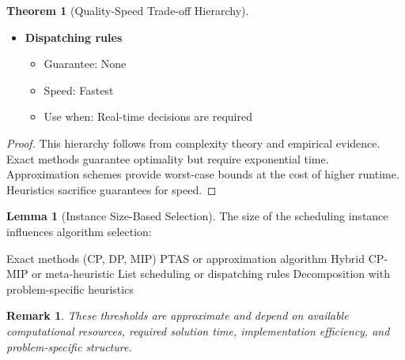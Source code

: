\documentclass{article}
\newtheorem{remark}{Remark}
\theoremstyle{definition}
\newtheorem{theorem}{Theorem}
\newtheorem{lemma}{Lemma}
\begin{document}
\begin{theorem}[Quality-Speed Trade-off Hierarchy]
\begin{itemize}
    \item \textbf{Dispatching rules}
    \begin{itemize}
        \item Guarantee: None
        \item Speed: Fastest
        \item Use when: Real-time decisions are required
    \end{itemize}
\end{itemize}

\begin{proof}
This hierarchy follows from complexity theory and empirical evidence. Exact methods guarantee optimality but require exponential time. Approximation schemes provide worst-case bounds at the cost of higher runtime. Heuristics sacrifice guarantees for speed.
\end{proof}
\end{theorem}

\begin{lemma}[Instance Size-Based Selection]
The size of the scheduling instance influences algorithm selection:

\begin{algorithm}
\caption{Algorithm Selection Based on Instance Size}
\begin{algorithmic}[1]
        \State \Return Exact methods (CP, DP, MIP)
        \State \Return PTAS or approximation algorithm
        \State \Return Hybrid CP-MIP or meta-heuristic
        \State \Return List scheduling or dispatching rules
    \Else
        \State \Return Decomposition with problem-specific heuristics
    \EndIf
\EndProcedure
\end{algorithmic}
\end{algorithm}

\begin{remark}
These thresholds are approximate and depend on available computational resources, required solution time, implementation efficiency, and problem-specific structure.
\end{remark}
\end{lemma}
\end{document}

